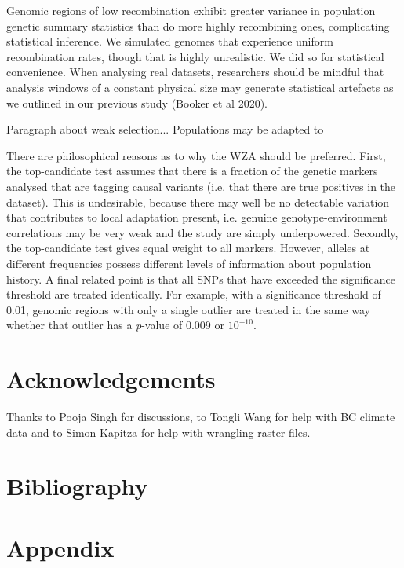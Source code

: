\documentclass[11pt,twoside,lineno]{GSA_format}
\begin{document}
Genomic regions of low recombination exhibit greater variance in population genetic summary statistics than do more highly recombining ones, complicating statistical inference. We simulated genomes that experience uniform recombination rates, though that is highly unrealistic. We did so for statistical convenience. When analysing real datasets, researchers should be mindful that analysis windows of a constant physical size may generate statistical artefacts as we outlined in our previous study (Booker et al 2020).

Paragraph about weak selection...
Populations may be adapted to 



There are philosophical reasons as to why the WZA should be preferred. First, the top-candidate test assumes that there is a fraction of the genetic markers analysed that are tagging causal variants (i.e. that there are true positives in the dataset). This is undesirable, because there may well be no detectable variation that contributes to local adaptation present, i.e. genuine genotype-environment correlations may be very weak and the study are simply underpowered. Secondly, the top-candidate test gives equal weight to all markers. However, alleles at different frequencies possess different levels of information about population history. A final related point is that all SNPs that have exceeded the significance threshold are treated identically. For example, with a significance threshold of 0.01, genomic regions with only a single outlier are treated in the same way whether that outlier has a \textit{p}-value of 0.009 or $10^{-10}$.


\section{Acknowledgements}

Thanks to Pooja Singh for discussions, to Tongli Wang for help with BC climate data and to Simon Kapitza for help with wrangling raster files. 


\section{Bibliography}


%


\section{Appendix}
\end{document}
